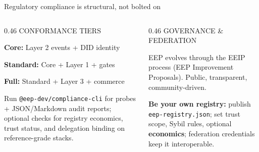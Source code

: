 \documentclass[aspectratio=169,10pt]{beamer}
\begin{document}
\begin{frame}[shrink=5]{Regulatory compliance is structural, not bolted on}
\begin{columns}[T]
\begin{column}{0.46\textwidth}
{\footnotesize\color{accent} CONFORMANCE TIERS}\par
\vspace{3pt}
{\footnotesize\color{txtm}%
\textbf{Core:} Layer 2 events + DID identity\par
\vspace{2pt}
\textbf{Standard:} Core + Layer 1 + gates\par
\vspace{2pt}
\textbf{Full:} Standard + Layer 3 + commerce\par
\vspace{4pt}
Run \texttt{@eep-dev/compliance-cli} for probes + JSON/Markdown audit reports; optional checks for registry economics, trust status, and delegation binding on reference-grade stacks.%
}
\end{column}
\begin{column}{0.46\textwidth}
{\footnotesize\color{cyan} GOVERNANCE \& FEDERATION}\par
\vspace{3pt}
{\footnotesize\color{txtm}%
EEP evolves through the EEIP process (EEP Improvement Proposals). Public, transparent, community-driven.\par
\vspace{3pt}
\textbf{Be your own registry:} publish \texttt{eep-registry.json}; set trust scope, Sybil rules, optional \textbf{economics}; federation credentials keep it interoperable.%
}
\end{column}
\end{columns}
\end{frame}
\end{document}
